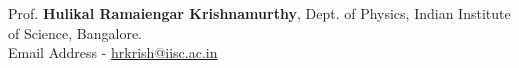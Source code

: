 

\begin{cventries}


\begin{cvitems}

  \item{Prof. \textbf{Hulikal Ramaiengar Krishnamurthy},} %
    {Dept. of Physics, Indian Institute of Science, Bangalore.} %
    {} %
    {\\}
    {Email Address - \href{mailto:hrkrish@iisc.ac.in}{hrkrish@iisc.ac.in}} %

\end{cvitems}
\end{cventries}
